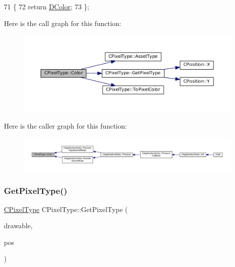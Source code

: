 \begin{DoxyCode}
71                                   \{
72             \textcolor{keywordflow}{return} \hyperlink{classCPixelType_a474243cf748aee94cfa207659e940b6c}{DColor};  
73         \};
\end{DoxyCode}
Here is the call graph for this function\+:\nopagebreak
\begin{figure}[H]
\begin{center}
\leavevmode
\includegraphics[width=350pt]{classCPixelType_a54864220447608dfad4cd579a5a4016c_cgraph}
\end{center}
\end{figure}
Here is the caller graph for this function\+:\nopagebreak
\begin{figure}[H]
\begin{center}
\leavevmode
\includegraphics[width=350pt]{classCPixelType_a54864220447608dfad4cd579a5a4016c_icgraph}
\end{center}
\end{figure}
\hypertarget{classCPixelType_af38a22feec4bef33deeb628b0877d464}{}\label{classCPixelType_af38a22feec4bef33deeb628b0877d464} 
\subsubsection{\texorpdfstring{Get\+Pixel\+Type()}{GetPixelType()}\hspace{0.1cm}{\footnotesize\ttfamily [1/2]}}
{\footnotesize\ttfamily \hyperlink{classCPixelType}{C\+Pixel\+Type} C\+Pixel\+Type\+::\+Get\+Pixel\+Type (\begin{DoxyParamCaption}\item[{Gdk\+Drawable $\ast$}]{drawable,  }\item[{const \hyperlink{classCPosition}{C\+Position} \&}]{pos }\end{DoxyParamCaption})\hspace{0.3cm}{\ttfamily [static]}}



